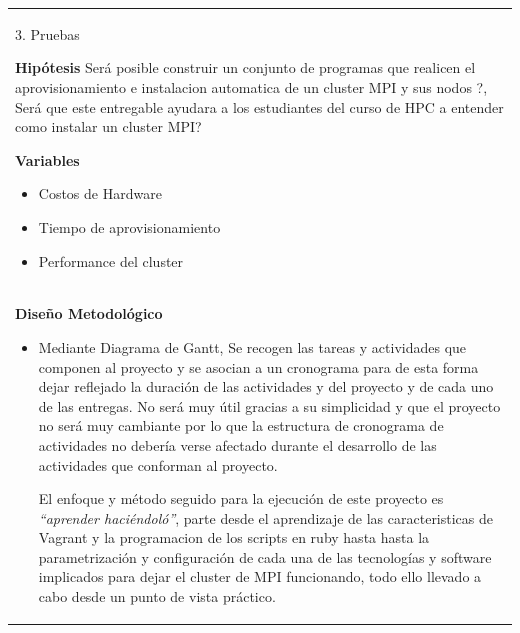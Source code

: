 \documentclass[letter,12pt]{article}
\begin{document}
\begin{center}
\begin{tabular}{|p{15.5cm}|}
\hline    
        
        3. Pruebas
  
    \textbf{Hipótesis}
    Será posible construir un conjunto de programas que realicen el aprovisionamiento e instalacion automatica de un cluster MPI y sus nodos ?, Será que este entregable ayudara a los estudiantes del curso de HPC a entender como instalar un cluster MPI?
    \par
    
    \textbf{Variables}
    \begin{itemize}
        \item Costos de Hardware
        \item Tiempo de aprovisionamiento
        \item Performance del cluster
    \end{itemize} \\

    
    \textbf{Diseño Metodológico}
    \begin{itemize}
        \item  Mediante Diagrama de Gantt, Se recogen las tareas y actividades que componen al
proyecto y se asocian a un cronograma para de esta forma dejar reflejado la
duración de las actividades y del proyecto y de cada uno de las entregas. No será
muy útil gracias a su simplicidad y que el proyecto no será muy cambiante por lo
que la estructura de cronograma de actividades no debería verse afectado durante
el desarrollo de las actividades que conforman al proyecto.

  El enfoque y método seguido para la ejecución de este proyecto es \textit{“aprender haciéndoló”}, parte desde el aprendizaje de las caracteristicas de Vagrant y la programacion de los scripts en ruby hasta hasta la parametrización y configuración de cada una de las tecnologías y software implicados para dejar el cluster de MPI funcionando, todo ello llevado a cabo desde un punto de vista práctico.
        
        
    \end{itemize}\\  
        
\hline
\end{tabular}
\end{center}
\end{document}

